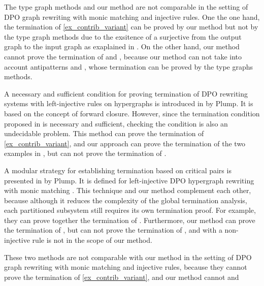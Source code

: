 The type graph methods and our method are not comparable in the setting of DPO graph rewriting with monic matching and injective rules. One the one hand, the termination of \autoref{ex_contrib_variant} can be proved by our method but not by the type graph methods due to the exsitence of a surjective from the output graph to the input graph as exaplained in \cite[Example D.4]{EndrullisOverbeek2024Generalized}. On the other hand, our method cannot prove the termination of \cite[Example 1, Ad-hoc Routing Protocol]{bruggink2014termination} and \cite[Example D3]{EndrullisOverbeek2024Generalized}, because our method can not take into account antipatterns \cite[Remark 6.2]{Overbeek2024subgraph} and \cite[Examples D1, D2 and D3]{EndrullisOverbeek2024Generalized}, whose termination can be proved by the type graphs methods.

A necessary and sufficient condition for proving termination of DPO rewriting systems with left-injective rules on hypergraphs is introduced in \cite{Plump1995} by Plump. It is based on the concept of forward closure. However, since the termination condition proposed in \cite{Plump1995} is necessary and sufficient, checking the condition is also an undecidable problem. This method can prove the termination of \autoref{ex_contrib_variant}, and our approach can prove the termination of the two examples in \cite{Plump1995}, but can not prove the termination of \cite[Example 4.1]{Plump1995}.

A modular strategy for establishing termination based on critical pairs is presented in \cite{plump2018modular} by Plump. It is defined for left-injective DPO hypergraph rewriting with monic matching \cite[Section 2.2]{plump2018modular}. 
This technique and our method complement each other, because although it reduces the complexity of the global termination analysis, each partitioned subsystem still requires its own termination proof. For example, they can prove together the termination of \cite[Example 4]{plump2018modular}.
Furthermore, our method can prove the termination of \cite[Examples 1 and 5]{plump2018modular}, but can not prove the termination of \cite[Example 4]{plump2018modular}, and \cite[Example 6]{plump2018modular} with a non-injective rule is not in the scope of our method. 

These two methods are not comparable with our method in the setting of DPO graph rewriting with monic matching and injective rules, because they cannot prove the termination of \autoref{ex_contrib_variant}, and our method cannot   and

